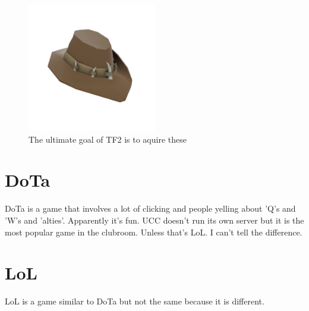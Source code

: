 \begin{figure}[H]
	\centering
	\includegraphics[width=0.5\textwidth]{figures/tf2_hat.png}
	\caption{The ultimate goal of TF2 is to aquire these}
	\label{tf2_hat.png}
\end{figure}

\section{DoTa}
DoTa is a game that involves a lot of clicking and people yelling about 'Q's and 'W's and 'alties'. Apparently it's fun. UCC doesn't run its own server but it is the most popular game in the clubroom. Unless that's LoL. I can't tell the difference.

\section{LoL}
LoL is a game similar to DoTa but not the same because it is different.
